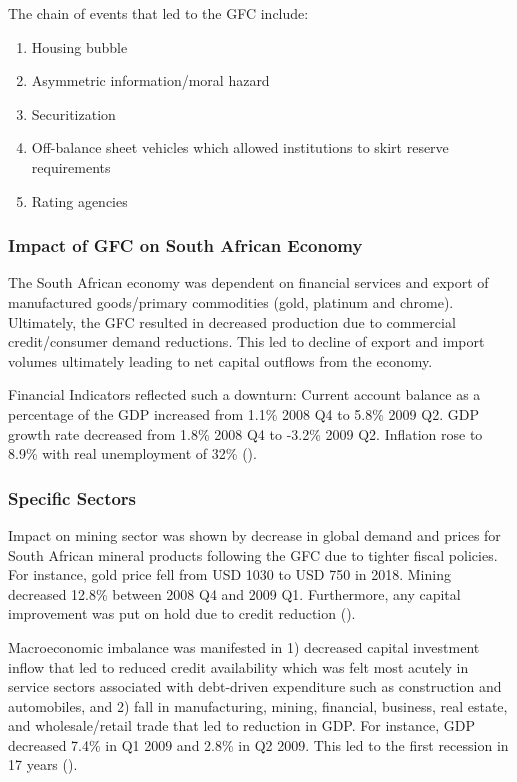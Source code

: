 \documentclass{elsarticle}
\begin{document}
The chain of events that led to the GFC include:
\begin{enumerate}
    \item Housing bubble
    \item Asymmetric information/moral hazard
    \item Securitization
    \item Off-balance sheet vehicles which allowed institutions to skirt reserve requirements
    \item Rating agencies
\end{enumerate}

\subsubsection{Impact of GFC on South African Economy}
The South African economy was dependent on financial services and export of manufactured goods/primary commodities (gold, platinum and chrome). Ultimately, the GFC resulted in decreased production due to commercial credit/consumer demand reductions. This led to decline of export and import volumes ultimately leading to net capital outflows from the economy.

Financial Indicators reflected such a downturn: Current account balance as a percentage of the GDP increased from 1.1\% 2008 Q4 to 5.8\% 2009 Q2. GDP growth rate decreased from 1.8\% 2008 Q4 to -3.2\% 2009 Q2. Inflation rose to 8.9\% with real unemployment of 32\% (\cite{Ravinder2014}). 

\subsubsection{Specific Sectors}
Impact on mining sector was shown by decrease in global demand and prices for South African mineral products following the GFC due to tighter fiscal policies. For instance, gold price fell from USD 1030 to USD 750 in 2018. Mining decreased 12.8\% between 2008 Q4 and 2009 Q1. Furthermore, any capital improvement was put on hold due to credit reduction (\cite{Nyanjowa2008}).

Macroeconomic imbalance was manifested in 1) decreased capital investment inflow that led to reduced credit availability which was felt most acutely in service sectors associated with debt-driven expenditure such as construction and automobiles, and 2) fall in manufacturing, mining, financial, business, real estate, and wholesale/retail trade that led to reduction in GDP. For instance, GDP decreased 7.4\% in Q1 2009 and 2.8\% in Q2 2009. This led to the first recession in 17 years (\cite{ILO2010}).
\end{document}

